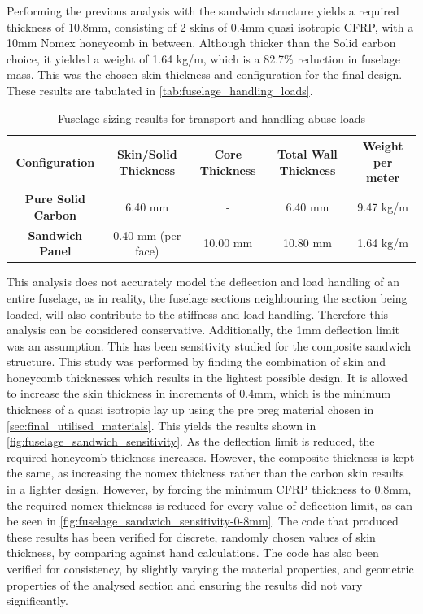 Performing the previous analysis with the sandwich structure yields a required thickness of 10.8mm, consisting of 2 skins of 0.4mm quasi isotropic CFRP, with a 10mm Nomex honeycomb in between. Although thicker than the Solid carbon choice, it yielded a weight of 1.64 kg/m, which is a 82.7\% reduction in fuselage mass. This was the chosen skin thickness and configuration for the final design. These results are tabulated in \autoref{tab:fuselage_handling_loads}.

\begin{table}[H]
    \centering
    \caption{Fuselage sizing results for transport and handling abuse loads}
    \begin{tabular}{|c||c|c|c|c|}\hline
         \textbf{Configuration} & Skin/Solid Thickness & Core Thickness & Total Wall Thickness & Weight per meter \\\hline
         \textbf{Pure Solid Carbon} & 6.40 mm & - & 6.40 mm & 9.47 kg/m \\\hline
         \textbf{Sandwich Panel} & 0.40 mm (per face) & 10.00 mm & 10.80 mm & 1.64 kg/m \\\hline
    \end{tabular}
    
    \label{tab:fuselage_handling_loads}
\end{table}


This analysis does not accurately model the deflection and load handling of an entire fuselage, as in reality, the fuselage sections neighbouring the section being loaded, will also contribute to the stiffness and load handling. Therefore this analysis can be considered conservative. Additionally, the 1mm deflection limit was an assumption. This has been sensitivity studied for the composite sandwich structure. This study was performed by finding the combination of skin and honeycomb thicknesses which results in the lightest possible design. It is allowed to increase the skin thickness in increments of 0.4mm, which is the minimum thickness of a quasi isotropic lay up using the pre preg material chosen in \autoref{sec:final_utilised_materials}. This yields the results shown in \autoref{fig:fuselage_sandwich_sensitivity}. As the deflection limit is reduced, the required honeycomb thickness increases. However, the composite thickness is kept the same, as increasing the nomex thickness rather than the carbon skin results in a lighter design. However, by forcing the minimum CFRP thickness to 0.8mm, the required nomex thickness is reduced for every value of deflection limit, as can be seen in \autoref{fig:fuselage_sandwich_sensitivity-0-8mm}. The code that produced these results has been verified for discrete, randomly chosen values of skin thickness, by comparing against hand calculations. The code has also been verified for consistency, by slightly varying the material properties, and geometric properties of the analysed section and ensuring the results did not vary significantly. 

